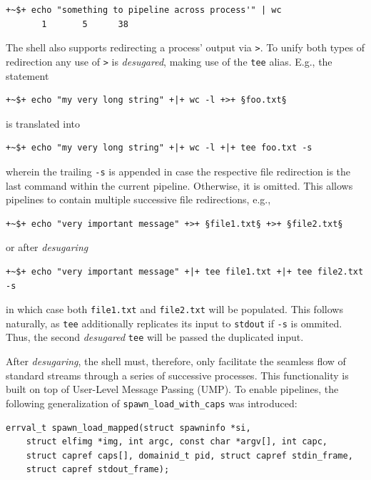 \begin{lstlisting}[style=ShellInputStyle, deletekeywords={command}, caption={Execution of an Exemplary Pipeline}, label={listing:shell_pipeline_ex}]
 +~$+ echo "something to pipeline across process'" | wc
       1       5      38
\end{lstlisting}

The shell also supports redirecting a process' output via \texttt{>}. To unify both types of redirection any use of \texttt{>} is \emph{desugared}, making use of the \texttt{tee} alias. E.g., the statement

\begin{lstlisting}[style=ShellInputStyle, deletekeywords={command}]
 +~$+ echo "my very long string" +|+ wc -l +>+ §foo.txt§
\end{lstlisting}
is translated into
\begin{lstlisting}[style=ShellInputStyle, deletekeywords={command}]
 +~$+ echo "my very long string" +|+ wc -l +|+ tee foo.txt -s
\end{lstlisting}

wherein the trailing \texttt{-s} is appended in case the respective file redirection is the last command within the current pipeline. Otherwise, it is omitted. This allows pipelines to contain multiple successive file redirections, e.g.,
\begin{lstlisting}[style=ShellInputStyle, deletekeywords={command}]
 +~$+ echo "very important message" +>+ §file1.txt§ +>+ §file2.txt§
\end{lstlisting}
or after \emph{desugaring}
\begin{lstlisting}[style=ShellInputStyle, deletekeywords={command}]
 +~$+ echo "very important message" +|+ tee file1.txt +|+ tee file2.txt -s
\end{lstlisting}
in which case both \texttt{file1.txt} and \texttt{file2.txt} will be populated. This follows naturally, as \texttt{tee} additionally replicates its input to \texttt{stdout} if \texttt{-s} is ommited. Thus, the second \emph{desugared} \texttt{tee} will be passed the duplicated input.

After \emph{desugaring}, the shell must, therefore, only facilitate the seamless flow of standard streams through a series of successive processes. This functionality is built on top of User-Level Message Passing (UMP). To enable pipelines, the following generalization of \texttt{spawn\_load\_with\_caps} was introduced:

\begin{lstlisting}[caption={Generalization of \texttt{spawn\_load\_with\_caps}}]
errval_t spawn_load_mapped(struct spawninfo *si,
	struct elfimg *img, int argc, const char *argv[], int capc,
	struct capref caps[], domainid_t pid, struct capref stdin_frame,
	struct capref stdout_frame);\end{lstlisting}

